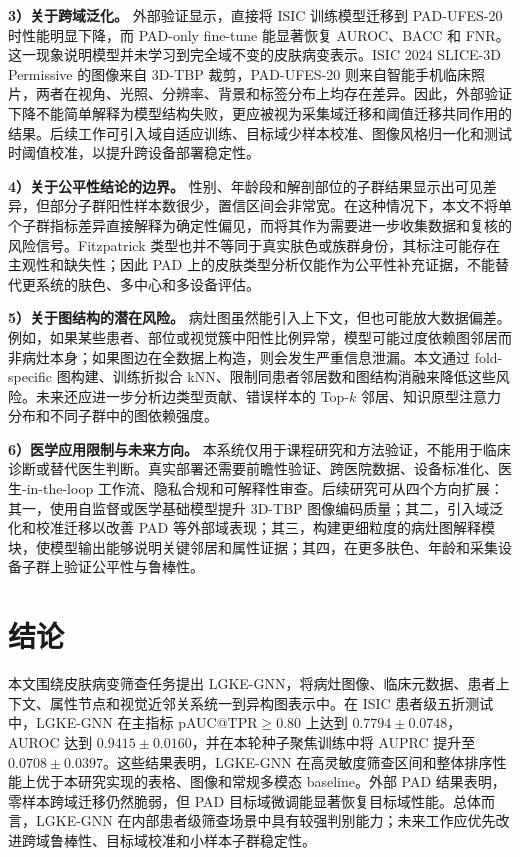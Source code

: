 \documentclass[UTF8,a4paper,10pt,twocolumn,fontset=fandol]{ctexart}
\newcommand{\isic}{ISIC 2024 SLICE-3D Permissive}
\newcommand{\pad}{PAD-UFES-20}
\newcommand{\modelname}{LGKE-GNN}
\begin{document}
\textbf{3）关于跨域泛化。}
外部验证显示，直接将 ISIC 训练模型迁移到 \pad{} 时性能明显下降，而 PAD-only fine-tune 能显著恢复 AUROC、BACC 和 FNR。这一现象说明模型并未学习到完全域不变的皮肤病变表示。\isic{} 的图像来自 3D-TBP 裁剪，\pad{} 则来自智能手机临床照片，两者在视角、光照、分辨率、背景和标签分布上均存在差异。因此，外部验证下降不能简单解释为模型结构失败，更应被视为采集域迁移和阈值迁移共同作用的结果。后续工作可引入域自适应训练、目标域少样本校准、图像风格归一化和测试时阈值校准，以提升跨设备部署稳定性。

\textbf{4）关于公平性结论的边界。}
性别、年龄段和解剖部位的子群结果显示出可见差异，但部分子群阳性样本数很少，置信区间会非常宽。在这种情况下，本文不将单个子群指标差异直接解释为确定性偏见，而将其作为需要进一步收集数据和复核的风险信号。Fitzpatrick 类型也并不等同于真实肤色或族群身份，其标注可能存在主观性和缺失性；因此 PAD 上的皮肤类型分析仅能作为公平性补充证据，不能替代更系统的肤色、多中心和多设备评估。

\textbf{5）关于图结构的潜在风险。}
病灶图虽然能引入上下文，但也可能放大数据偏差。例如，如果某些患者、部位或视觉簇中阳性比例异常，模型可能过度依赖图邻居而非病灶本身；如果图边在全数据上构造，则会发生严重信息泄漏。本文通过 fold-specific 图构建、训练折拟合 kNN、限制同患者邻居数和图结构消融来降低这些风险。未来还应进一步分析边类型贡献、错误样本的 Top-$k$ 邻居、知识原型注意力分布和不同子群中的图依赖强度。

\textbf{6）医学应用限制与未来方向。}
本系统仅用于课程研究和方法验证，不能用于临床诊断或替代医生判断。真实部署还需要前瞻性验证、跨医院数据、设备标准化、医生-in-the-loop 工作流、隐私合规和可解释性审查。后续研究可从四个方向扩展：其一，使用自监督或医学基础模型提升 3D-TBP 图像编码质量；其二，引入域泛化和校准迁移以改善 PAD 等外部域表现；其三，构建更细粒度的病灶图解释模块，使模型输出能够说明关键邻居和属性证据；其四，在更多肤色、年龄和采集设备子群上验证公平性与鲁棒性。

\section{结论}
本文围绕皮肤病变筛查任务提出 \modelname{}，将病灶图像、临床元数据、患者上下文、属性节点和视觉近邻关系统一到异构图表示中。在 ISIC 患者级五折测试中，\modelname{} 在主指标 pAUC@TPR$\geq0.80$ 上达到 $0.7794\pm0.0748$，AUROC 达到 $0.9415\pm0.0160$，并在本轮种子聚焦训练中将 AUPRC 提升至 $0.0708\pm0.0397$。这些结果表明，\modelname{} 在高灵敏度筛查区间和整体排序性能上优于本研究实现的表格、图像和常规多模态 baseline。外部 PAD 结果表明，零样本跨域迁移仍然脆弱，但 PAD 目标域微调能显著恢复目标域性能。总体而言，\modelname{} 在内部患者级筛查场景中具有较强判别能力；未来工作应优先改进跨域鲁棒性、目标域校准和小样本子群稳定性。
\end{document}
